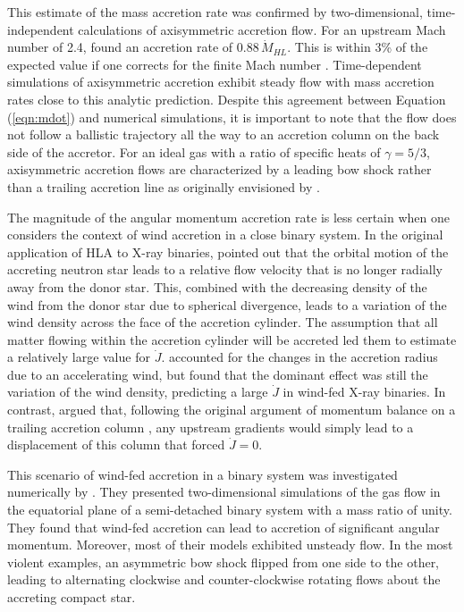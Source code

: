 \documentclass{emulateapj}
\begin{document}
This estimate of the mass accretion rate was confirmed by two-dimensional, time-independent calculations of axisymmetric accretion flow.
For an upstream Mach number of 2.4, \cite{h71} found
an accretion rate of $0.88\, \dot M_{HL}$.  This is within 3\% of the expected value if one corrects for the finite Mach 
number \citep{bondi52}.  Time-dependent simulations of axisymmetric accretion exhibit steady flow with mass accretion
rates close to this analytic prediction.
Despite this agreement between Equation (\ref{eqn:mdot}) and numerical simulations, it is important to note that the flow does not follow a ballistic
trajectory all the way to an accretion column on the back side of the accretor.
For an ideal gas with a ratio of specific heats of $\gamma=5/3$, axisymmetric accretion flows are characterized by a
leading bow shock \citep{h71} rather than a trailing accretion line as originally envisioned by \cite{hl39a}.  

The magnitude of the angular momentum accretion rate is less certain when one considers the context of wind accretion in a close binary system.  
In the original application of HLA to X-ray binaries, \citet{do73} pointed out that the orbital motion of the accreting neutron
star leads to a relative flow velocity that is no longer radially away from the donor star.  This, combined with the 
decreasing density of the wind from the
donor star due to spherical divergence, leads to a variation of the wind density across the face of the accretion cylinder.  The 
assumption that all matter flowing within the accretion cylinder will be accreted led them to estimate a relatively large value for $\dot J$.
\citet{sl76} accounted for the changes in the accretion radius due to an accelerating wind, but found that the dominant effect was
still the variation of the wind density, predicting a large $\dot J$ in wind-fed X-ray binaries.  In contrast, \citet{dp80} argued that,
following the original argument of momentum balance on a trailing accretion column \citep{hl39a}, any upstream gradients would simply lead
to a displacement of this column that forced $\dot J = 0$.

This scenario of wind-fed accretion in a binary system was investigated numerically by \citet{mis87}.  
They presented two-dimensional simulations of the gas flow in the equatorial
plane of a semi-detached binary system with a mass ratio of unity.  They found that wind-fed accretion can lead to
accretion of significant angular momentum.  Moreover, most of their models exhibited unsteady flow.  In the most violent examples,
an asymmetric bow shock flipped from one side to the other, leading to alternating clockwise and counter-clockwise rotating flows
about the accreting compact star.  
\end{document}
